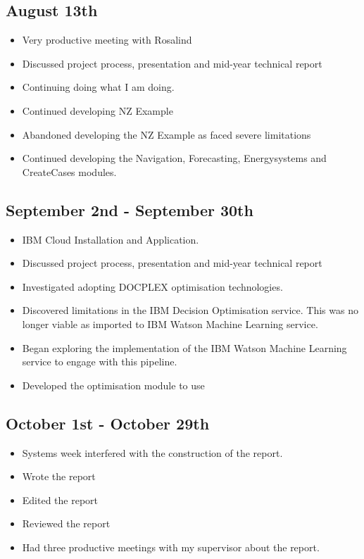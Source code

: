\documentclass[12pt]{article}
\begin{document}
\subsection*{August 13th}
\begin{itemize}
	\item Very productive meeting with Rosalind
	\item Discussed project process, presentation and mid-year technical report
	\item Continuing doing what I am doing.
	\item Continued developing NZ Example
	\item Abandoned developing the NZ Example as faced severe limitations
	\item Continued developing the Navigation, Forecasting, Energysystems and CreateCases modules.
\end{itemize}
\subsection*{September 2nd - September 30th}
\begin{itemize}
	\item IBM Cloud Installation and Application.
	\item Discussed project process, presentation and mid-year technical report
	\item Investigated adopting DOCPLEX optimisation technologies.
	\item Discovered limitations in the IBM Decision Optimisation service. This was no longer viable as imported to IBM Watson Machine Learning service.
	\item Began exploring the implementation of the IBM Watson Machine Learning service to engage with this pipeline.
	\item Developed the optimisation module to use
\end{itemize}
\subsection*{October 1st - October 29th}
\begin{itemize}
	\item Systems week interfered with the construction of the report.
	\item Wrote the report
	\item Edited the report
	\item Reviewed the report
	\item Had three productive meetings with my supervisor about the report.
\end{itemize}
\end{document}
